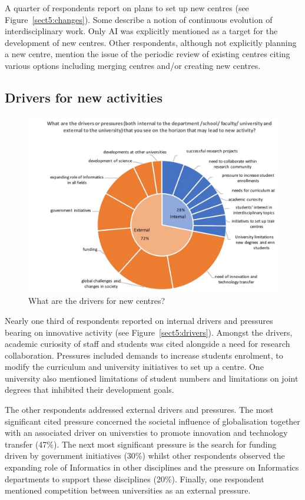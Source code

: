A quarter of respondents report on plans to set up new centres (see Figure~\ref{sect5:changes}). Some describe a notion of continuous evolution of interdisciplinary work. Only AI was explicitly mentioned as a target for the development of new centres. Other respondents, although not explicitly planning a new centre, mention the issue of the periodic review of existing centres citing various options including merging centres and/or creating new centres.  

\subsection{Drivers for new activities}

\begin{figure}[h]
\centering
\includegraphics[width = \linewidth]{charts/5g.jpg}
\caption{What are the drivers for new centres?}
\label{sect3:drivers}
\end{figure}
                                                                                                                    
Nearly one third of respondents reported on internal drivers and pressures bearing on innovative activity (see Figure~\ref{sect5:drivers}). Amongst the drivers, academic curiosity of staff and students was cited alongside a need for research collaboration. Pressures included demands to increase students enrolment, to modify the curriculum and university initiatives to set up a centre. One university also mentioned limitations of student numbers and limitations on joint degrees that inhibited their development goals.

The other respondents addressed external drivers and pressures. The most significant cited pressure concerned the societal influence of globalisation together with an associated driver on universties to promote innovation and  technology transfer (47\%).  The next most significant pressure is the search for funding driven by government initiatives (30\%) whilst other respondents observed the expanding role of Informatics in other disciplines and the pressure on Informatics departments to support these disciplines (20\%). Finally, one respondent mentioned competition between universities as an external pressure.

